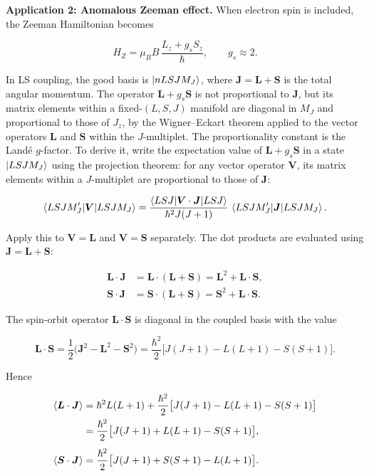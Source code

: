 \medskip\noindent\textbf{Application 2: Anomalous Zeeman effect.}
When electron spin is included, the Zeeman Hamiltonian becomes
\begin{linenomath}
\begin{equation*}
H_{Z} = \mu_{B}B\,\frac{L_{z} + g_{s}S_{z}}{\hbar},
\qquad g_{s} \approx 2.
\end{equation*}
\end{linenomath}
In LS coupling, the good basis is $\ket{nLSJM_{J}}$, where $\bm J = \bm L + \bm S$ is the total angular momentum. The operator $\bm L + g_{s}\bm S$ is not proportional to $\bm J$, but its matrix elements within a fixed-$(L,S,J)$ manifold are diagonal in $M_{J}$ and proportional to those of $J_{z}$, by the Wigner--Eckart theorem applied to the vector operators $\bm L$ and $\bm S$ within the $J$-multiplet. The proportionality constant is the Land\'e $g$-factor. To derive it, write the expectation value of $\bm L + g_{s}\bm S$ in a state $\ket{LSJM_{J}}$ using the projection theorem: for any vector operator $\bm V$, its matrix elements within a $J$-multiplet are proportional to those of $\bm J$:
\begin{linenomath}
\begin{equation*}
\braket{LSJM_{J}'|\bm V|LSJM_{J}} = \frac{\braket{LSJ|\bm V\cdot\bm J|LSJ}}{\hbar^{2}J(J+1)}\,
\braket{LSJM_{J}'|\bm J|LSJM_{J}}.
\end{equation*}
\end{linenomath}
Apply this to $\bm V = \bm L$ and $\bm V = \bm S$ separately. The dot products are evaluated using $\bm J = \bm L + \bm S$:
\begin{linenomath}
\begin{align*}
\bm L\cdot\bm J &= \bm L\cdot(\bm L + \bm S) = \bm L^{2} + \bm L\cdot\bm S, \\
\bm S\cdot\bm J &= \bm S\cdot(\bm L + \bm S) = \bm S^{2} + \bm L\cdot\bm S.
\end{align*}
\end{linenomath}
The spin-orbit operator $\bm L\cdot\bm S$ is diagonal in the coupled basis with the value
\begin{linenomath}
\begin{equation*}
\bm L\cdot\bm S = \frac{1}{2}\bigl(\bm J^{2} - \bm L^{2} - \bm S^{2}\bigr)
= \frac{\hbar^{2}}{2}\bigl[J(J+1) - L(L+1) - S(S+1)\bigr].
\end{equation*}
\end{linenomath}
Hence
\begin{linenomath}
\begin{align*}
\braket{\bm L\cdot\bm J} &= \hbar^{2}L(L+1) + \frac{\hbar^{2}}{2}\bigl[J(J+1)-L(L+1)-S(S+1)\bigr] \\
&= \frac{\hbar^{2}}{2}\bigl[J(J+1) + L(L+1) - S(S+1)\bigr], \\[4pt]
\braket{\bm S\cdot\bm J} &= \frac{\hbar^{2}}{2}\bigl[J(J+1) + S(S+1) - L(L+1)\bigr].
\end{align*}
\end{linenomath}
